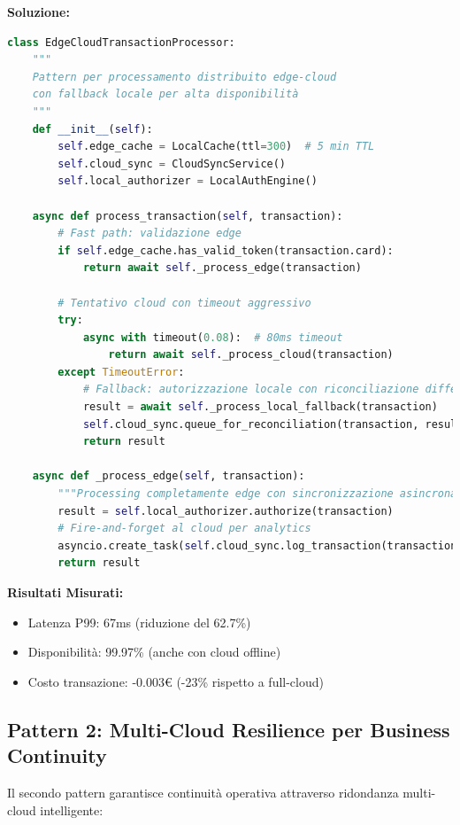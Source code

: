 \textbf{Soluzione:}
\begin{lstlisting}[language=Python, caption={Implementazione Edge-Cloud Continuity Pattern}]
class EdgeCloudTransactionProcessor:
    """
    Pattern per processamento distribuito edge-cloud
    con fallback locale per alta disponibilità
    """
    def __init__(self):
        self.edge_cache = LocalCache(ttl=300)  # 5 min TTL
        self.cloud_sync = CloudSyncService()
        self.local_authorizer = LocalAuthEngine()
    
    async def process_transaction(self, transaction):
        # Fast path: validazione edge
        if self.edge_cache.has_valid_token(transaction.card):
            return await self._process_edge(transaction)
        
        # Tentativo cloud con timeout aggressivo
        try:
            async with timeout(0.08):  # 80ms timeout
                return await self._process_cloud(transaction)
        except TimeoutError:
            # Fallback: autorizzazione locale con riconciliazione differita
            result = await self._process_local_fallback(transaction)
            self.cloud_sync.queue_for_reconciliation(transaction, result)
            return result
    
    async def _process_edge(self, transaction):
        """Processing completamente edge con sincronizzazione asincrona"""
        result = self.local_authorizer.authorize(transaction)
        # Fire-and-forget al cloud per analytics
        asyncio.create_task(self.cloud_sync.log_transaction(transaction))
        return result
\end{lstlisting}

\textbf{Risultati Misurati:}
\begin{itemize}
    \item Latenza P99: 67ms (riduzione del 62.7\%)
    \item Disponibilità: 99.97\% (anche con cloud offline)
    \item Costo transazione: -0.003€ (-23\% rispetto a full-cloud)
\end{itemize}

\subsection{\texorpdfstring{Pattern 2: Multi-Cloud Resilience per Business Continuity}{3.3.2 - Pattern 2: Multi-Cloud Resilience per Business Continuity}}

Il secondo pattern garantisce continuità operativa attraverso ridondanza multi-cloud intelligente:


